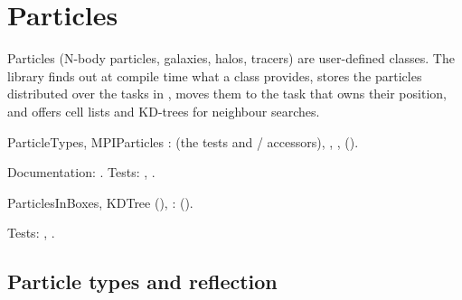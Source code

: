 \chapter{Particles}\label{ch:particles}

Particles (N-body particles, galaxies, halos, tracers) are user-defined classes. The library finds out at compile time
what a class provides, stores the particles distributed over the tasks in , moves them to the task
that owns their position, and offers cell lists and KD-trees for neighbour searches.

\begin{modulebox}{ParticleTypes, MPIParticles}
:  (the  tests and  /
 accessors), , ,
 ().\par
Documentation: . Tests: , .
\end{modulebox}
\begin{modulebox}{ParticlesInBoxes, KDTree}
 (), : 
().\par
Tests: , .
\end{modulebox}

\section{Particle types and reflection}\label{sec:part-reflection}

